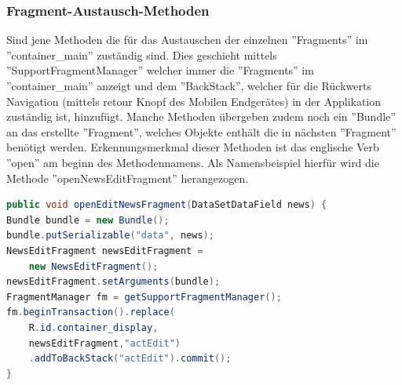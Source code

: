 \subsubsection{Fragment-Austausch-Methoden}
 Sind jene Methoden die für das Austauschen der einzelnen ''Fragments'' im ''container\_main'' zuständig sind. Dies geschieht mittels ''SupportFragmentManager'' welcher immer die ''Fragments'' im ''container\_main'' anzeigt und dem ''BackStack'', welcher für die Rückwerts Navigation (mittels retour Knopf des Mobilen Endgerätes) in der Applikation zuständig ist,  hinzufügt. Manche Methoden übergeben zudem noch ein ''Bundle'' an das erstellte ''Fragment'', welches Objekte enthält die in nächsten ''Fragment'' benötigt werden. Erkennungsmerkmal dieser Methoden ist das englische Verb ''open'' am beginn des Methodennamens. Als Namensbeispiel hierfür wird die Methode ''openNewsEditFragment'' herangezogen.
\begin{lstlisting}[language=Java,caption={Beispiel für Fragment-Austausch-Methode}]
public void openEditNewsFragment(DataSetDataField news) {
Bundle bundle = new Bundle();
bundle.putSerializable("data", news);
NewsEditFragment newsEditFragment =
    new NewsEditFragment();
newsEditFragment.setArguments(bundle);
FragmentManager fm = getSupportFragmentManager();
fm.beginTransaction().replace(
    R.id.container_display, 	
    newsEditFragment,"actEdit")
    .addToBackStack("actEdit").commit();
}
\end{lstlisting}
